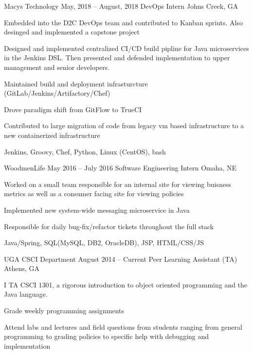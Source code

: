 \documentclass[10pt]{article}
\begin{document}
{	\job
	{Macys Technology}
	{May, 2018 – August, 2018}
	{DevOps Intern}
	{Johns Creek, GA}
	{\begin{newitemize}
		\item {Embedded into the D2C DevOps team and contributed to Kanban sprints. Also desinged and implemented a capstone project}
		\item {Designed and implemented centralized CI/CD build pipline for Java microservices in the Jenkins DSL. Then presented and defended implementation to upper management and senior developers.}
		\item {Maintained build and deployment infrasturcture (GitLab/Jenkins/Artifactory/Chef)}
		\item {Drove paradigm shift from GitFlow to TrueCI}
		\item {Contributed to large migration of code from legacy vm based infrastructure to a new containerized infrastructure}
		\item {Jenkins, Groovy, Chef, Python, Linux (CentOS), bash}
		\end{newitemize}}
	\job
	{WoodmenLife}
	{May 2016 – July 2016}
	{Software Engineering Intern}
	{Omaha, NE}
	{\begin{newitemize}
		\item {Worked on a small team responsible for an internal site for viewing buisness metrics as well as a consumer facing site for viewing policies}
		\item {Implemented new system-wide messaging microservice in Java}
		\item {Responsible for daily bug-fix/refactor tickets throughout the full stack}
		\item {Java/Spring, SQL(MySQL, DB2, OracleDB), JSP, HTML/CSS/JS}
		\end{newitemize}}
	\job
	{UGA CSCI Department}
	{August 2014 – Current}
	{Peer Learning Assistant (TA)}
	{Athens, GA}
	{\begin{newitemize}
		\item {I TA CSCI 1301, a rigorous introduction to object oriented programming and the Java language.}
		\item {Grade weekly programming assignments}
		\item {Attend labs and lectures and field questions from students ranging from general programming to grading policies to specific help with debugging and implementation}
		\end{newitemize}}
}

\end{document}

